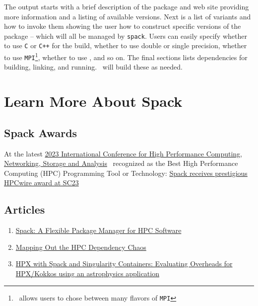 \documentclass[10pt, oneside]{article}   	%
\begin{document}
The output starts with a brief description of the package and web site providing more information and a listing of available versions. Next is a list of variants and how to invoke them showing the user how to construct specific versions of the package -- which will all be managed by \texttt{spack}.  Users can easily specify whether to use \texttt{C} or \texttt{C++} for the build, whether to use double or single precision, whether to use \texttt{MPI}\footnote{\spack \ allows users to chose between many flavors of \texttt{MPI}}, whether to use \openmp, and so on. The final sections lists dependencies for building, linking, and running. \spack \ will build these as needed.

	

\section{Learn More About Spack}

\subsection{Spack Awards}
At the latest \href{https://sc23.supercomputing.org/}{2023 International Conference for High Performance Computing, Networking, Storage and Analysis}  \spack \ recognized as the Best High Performance Computing (HPC) Programming Tool or Technology:
\href{https://www.llnl.gov/article/50626/spack-receives-prestigious-hpcwire-award-sc23}{Spack receives prestigious HPCwire award at SC23}


\subsection{Articles}
\begin{enumerate}
	\item \href{https://computing.llnl.gov/projects/spack-hpc-package-manager}{Spack: A Flexible Package Manager for HPC Software} 
	\item \href{https://arxiv.org/pdf/2211.05118}{Mapping Out the HPC Dependency Chaos}
	\item \href{https://arxiv.org/pdf/2405.00016}{HPX with Spack and Singularity Containers: Evaluating Overheads for HPX/Kokkos using an astrophysics application}
\end{enumerate}
\end{document}
